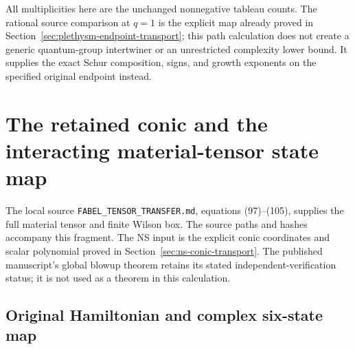 All multiplicities here are the unchanged nonnegative tableau counts.
The rational source comparison at $q=1$ is the explicit map already
proved in Section~\ref{sec:plethysm-endpoint-transport}; this path
calculation does not create a generic quantum-group intertwiner or an
unrestricted complexity lower bound. It supplies the exact Schur
composition, signs, and growth exponents on the specified original
endpoint instead.

\section{The retained conic and the interacting material-tensor state map}
\label{sec:ym-retained-composition}

The local source \texttt{FABEL\_TENSOR\_TRANSFER.md}, equations
(97)--(105), supplies the full material tensor and finite Wilson box.
The source paths and hashes accompany this fragment. The NS input
is the explicit conic coordinates and scalar polynomial proved in
Section~\ref{sec:ns-conic-transport}. The published manuscript's
global blowup theorem retains its stated independent-verification
status; it is not used as a theorem in this calculation.

\subsection{Original Hamiltonian and complex six-state map}

